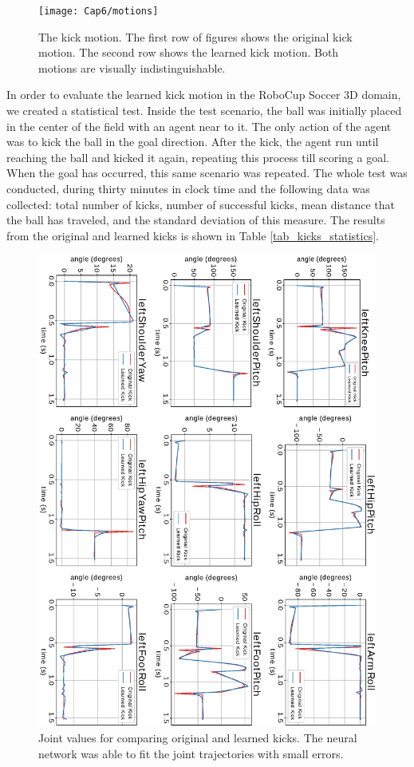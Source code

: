 \begin{figure}[!htbp]
	\centering
	\texttt{[image: Cap6/motions]}
	\caption{The kick motion. The first row of figures shows the original kick motion. The second row shows the learned kick motion. Both motions are visually indistinguishable.}
	\label{fig:motions}
\end{figure} 

In order to evaluate the learned kick motion in the RoboCup Soccer 3D domain, we created a statistical test. Inside the test scenario, the ball was initially placed in the center of the field with an agent near to it. The only action of the agent was to kick the ball in the goal direction. After the kick, the agent run until reaching the ball and kicked it again, repeating this process till scoring a goal. When the goal has occurred, this same scenario was repeated. The whole test was conducted, during thirty minutes in clock time and the following data was collected: total number of kicks, number of successful kicks, mean distance that the ball has traveled, and the standard deviation of this measure. The results from the original and learned kicks is shown in Table \ref{tab_kicks_statistics}.


\begin{figure}[!htbp]
	\centering
	\includegraphics[angle=90,width=1\textwidth]{Cap6/kick_joints_curve}
	\caption{Joint values for comparing original and learned kicks. The neural network was able to fit the joint trajectories with small errors.}
	\label{fig:kick_joints_curves}
\end{figure}



